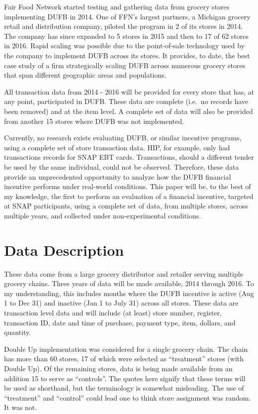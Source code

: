 \documentclass[12pt,letterpaperpaper,]{book}
\begin{document}
Fair Food Network started testing and gathering data from grocery stores
implementing DUFB in 2014. One of FFN's largest partners, a Michigan
grocery retail and distribution company, piloted the program in 2 of its
stores in 2014. The company has since expanded to 5 stores in 2015 and
then to 17 of 62 stores in 2016. Rapid scaling was possible due to the
point-of-sale technology used by the company to implement DUFB across
its stores. It provides, to date, the best case study of a firm
strategically scaling DUFB across numerous grocery stores that span
different geographic areas and populations.

All transaction data from 2014 - 2016 will be provided for every store
that has, at any point, participated in DUFB. These data are complete
(i.e.~no records have been removed) and at the item level. A complete
set of data will also be provided from another 15 stores where DUFB was
not implemented.

Currently, no research exists evaluating DUFB, or similar incentive
programs, using a complete set of store transaction data. HIP, for
example, only had transactions records for SNAP EBT cards. Transactions,
should a different tender be used by the same individual, could not be
observed. Therefore, these data provide an unprecedented opportunity to
analyze how the DUFB financial incentive performs under real-world
conditions. This paper will be, to the best of my knowledge, the first
to perform an evaluation of a financial incentive, targeted at SNAP
participants, using a complete set of data, from multiple stores, across
multiple years, and collected under non-experimental conditions.

\section*{Data Description}\label{data-1}

These data come from a large grocery distributor and retailer serving
multiple grocery chains. Three years of data will be made available,
2014 through 2016. To my understanding, this includes months where the
DUFB incentive is active (Aug 1 to Dec 31) and inactive (Jan 1 to July
31) across all stores. These data are transaction level data and will
include (at least) store number, register, transaction ID, date and time
of purchase, payment type, item, dollars, and quantity.

Double Up implementation was considered for a single grocery chain. The
chain has more than 60 stores, 17 of which were selected as
``treatment'' stores (with Double Up). Of the remaining stores, data is
being made available from an addition 15 to serve as ``controls''. The
quotes here signify that these terms will be used as shorthand, but the
terminology is somewhat misleading. The use of ``treatment'' and
``control'' could lead one to think store assignment was random. It was
not.
\end{document}
